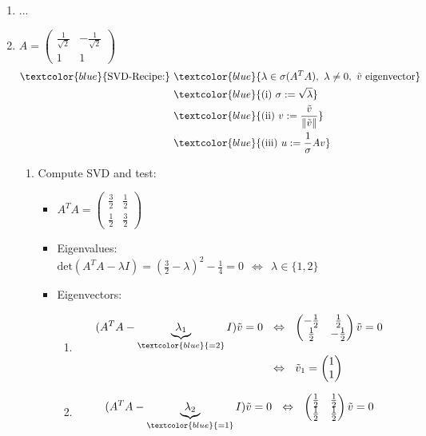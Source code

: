 {\color{solution}
\begin{enumerate}
	\item ...
	\item $A=\begin{pmatrix}\frac{1}{\sqrt{2}}&-\frac{1}{\sqrt{2}}\\1&1\end{pmatrix}$
	\begin{align*}
	\textcolor{blue}{\text{SVD-Recipe:}}~&\textcolor{blue}{\lambda\in\sigma(A^TA),~\lambda\neq 0,~\tilde{v}~\text{eigenvector}}\\&\textcolor{blue}{(\text{i})~\sigma:=\sqrt{\lambda}}\\&\textcolor{blue}{(\text{ii})~v:=\frac{\tilde{v}}{\|\tilde{v}\|}}\\&\textcolor{blue}{(\text{iii})~u:=\frac{1}{\sigma}Av}
	\end{align*}
	\begin{enumerate}
		\item 
		Compute SVD and test:%
		\begin{itemize}
			\item $A^TA =\begin{pmatrix}\frac{3}{2}&\frac{1}{2}\\\frac{1}{2}&\frac{3}{2}\end{pmatrix}$
			\item Eigenvalues:\\$\text{det}(A^TA-\lambda I) =(\frac{3}{2}-\lambda)^2-\frac{1}{4}=0~~\Leftrightarrow~~\lambda\in\{1,2\}$
			\item Eigenvectors:
			\begin{enumerate}
				\item \begin{align*}(A^TA-\underbrace{\lambda_1}_{\textcolor{blue}{=2}}I)\tilde{v}=0~~&\Leftrightarrow~~\begin{pmatrix}-\frac{1}{2}&\frac{1}{2}\\\frac{1}{2}&-\frac{1}{2}\end{pmatrix}\tilde{v}=0\\
				&\Leftrightarrow~~\tilde{v}_1=\begin{pmatrix}1\\1\end{pmatrix}
				\end{align*}
				\item 
				\begin{align*}
				(A^TA-\underbrace{\lambda_2}_{\textcolor{blue}{=1}}I)\tilde{v}=0~~&\Leftrightarrow~~\begin{pmatrix}\frac{1}{2}&\frac{1}{2}\\\frac{1}{2}&\frac{1}{2}\end{pmatrix}\tilde{v}=0\\

\end{align*}
\end{enumerate}
\end{itemize}
\end{enumerate}
\end{enumerate}}

